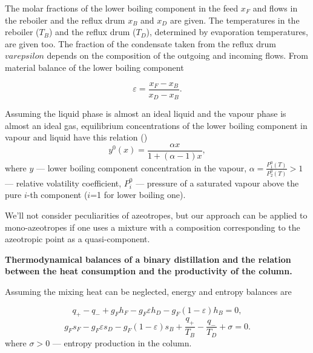 \documentclass[12pt]{article}
\begin{document}
   The molar fractions of the lower boiling component in the feed $x_{F}$ and flows in the reboiler and the reflux drum $x_{B}$ and $x_{D}$ are given. The temperatures in the reboiler ($T_B$) and the reflux drum ($T_D$), determined by evaporation temperatures, are given too. The fraction of the condensate taken from the reflux drum $varepsilon$ depends on the composition of the outgoing and incoming flows. From material balance of the lower boiling component

\begin{equation}\label{2}
\varepsilon=\frac{x_F-x_B}{x_D-x_B}.
\end{equation}

Assuming the liquid phase is almost an ideal liquid and the vapour phase is almost an ideal gas,  equilibrium concentrations of the lower boiling component in vapour and liquid have this relation (\cite{PlnvskNklv}) 
\begin{equation}\label{5.42}
y^0(x)= \frac{\alpha x}{1+(\alpha-1)x},
\end{equation}
where  $y$ --- lower boiling component concentration in the vapour, $\alpha= \frac{P_1^0(T)}{P_2^0(T)}>1$ --- relative volatility coefficient, $P_i^0$ --- pressure of a saturated vapour above the pure $i$-th component ($i$=1 for lower boiling one). 

We'll not consider peculiarities of azeotropes, but our approach can be applied to mono-azeotropes if one uses a mixture with a composition corresponding to the azeotropic point as a quasi-component.

\vspace*{0.3cm}
\textbf{Thermodynamical balances of a binary distillation and the relation between the heat consumption and  the productivity of the column.}

Assuming the mixing heat can be neglected, energy and entropy balances are 

\begin{equation}\label{5.44}
q_{+} - q_{-} + g_{F} h_{F} - g_{F}\varepsilon h_{D} - g_{F}(1-\varepsilon) h_{B} = 0,
\end{equation}
\begin{equation}\label{5.45}
g_{F} s_{F} - g_{F}\varepsilon s_{D} - g_{F}(1-\varepsilon) s_{B}+ \frac{q_{+}}{T_B} -
\frac{q_{-}}{T_D} + \sigma = 0.
\end{equation}
where $\sigma>0$  --- entropy production in the column.
 
\end{document}
